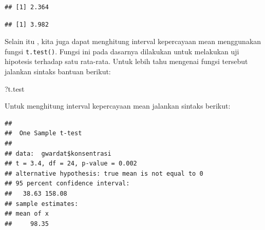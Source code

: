 \documentclass[]{book}
\newenvironment{Shaded}{\begin{snugshade}}{\end{snugshade}}
\newcommand{\KeywordTok}[1]{\textcolor[rgb]{0.13,0.29,0.53}{\textbf{#1}}}
\newcommand{\DataTypeTok}[1]{\textcolor[rgb]{0.13,0.29,0.53}{#1}}
\newcommand{\DecValTok}[1]{\textcolor[rgb]{0.00,0.00,0.81}{#1}}
\newcommand{\FloatTok}[1]{\textcolor[rgb]{0.00,0.00,0.81}{#1}}
\newcommand{\CommentTok}[1]{\textcolor[rgb]{0.56,0.35,0.01}{\textit{#1}}}
\newcommand{\OperatorTok}[1]{\textcolor[rgb]{0.81,0.36,0.00}{\textbf{#1}}}
\newcommand{\NormalTok}[1]{#1}
\begin{document}
\begin{Shaded}
\end{Shaded}

\begin{verbatim}
## [1] 2.364
\end{verbatim}

\begin{Shaded}
\end{Shaded}

\begin{verbatim}
## [1] 3.982
\end{verbatim}

Selain itu , kita juga dapat menghitung interval kepercayaan mean
menggunakan fungsi \texttt{t.test()}. Fungsi ini pada dasarnya dilakukan
untuk melakukan uji hipotesis terhadap satu rata-rata. Untuk lebih tahu
mengenai fungsi tersebut jalankan sintaks bantuan berikut:

\begin{Shaded}
\begin{Highlighting}[]
\NormalTok{?t.test}
\end{Highlighting}
\end{Shaded}

Untuk menghitung interval kepercayaan mean jalankan sintaks berikut:

\begin{Shaded}
\end{Shaded}

\begin{verbatim}
## 
##  One Sample t-test
## 
## data:  gwardat$konsentrasi
## t = 3.4, df = 24, p-value = 0.002
## alternative hypothesis: true mean is not equal to 0
## 95 percent confidence interval:
##   38.63 158.08
## sample estimates:
## mean of x 
##     98.35
\end{verbatim}
\end{document}
